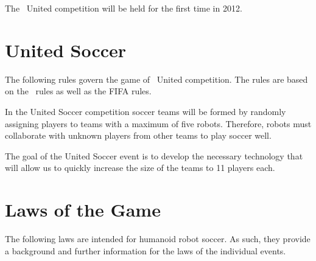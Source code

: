\documentclass[12pt]{hurocup}
\begin{document}
The \HuroCup\ United competition will be held for the first time in
2012.

\newpage

\section*{United Soccer}
\label{sec:soccer}

The following rules govern the game of \HuroCup\ United
competition. The rules are based on the \HuroCup\ rules as well as the
FIFA rules.

In the United Soccer competition soccer teams will be formed by
randomly assigning players to teams with a maximum of five
robots. Therefore, robots must collaborate with unknown players from
other teams to play soccer well.

The goal of the United Soccer event is to develop the necessary
technology that will allow us to quickly increase the size of the
teams to 11 players each.

\section*{Laws of the Game}
\label{sec:laws}

The following laws are intended for humanoid robot soccer. As such,
they provide a background and further information for the laws of the
individual events.

\label{law:field-of-play}
\end{document}

